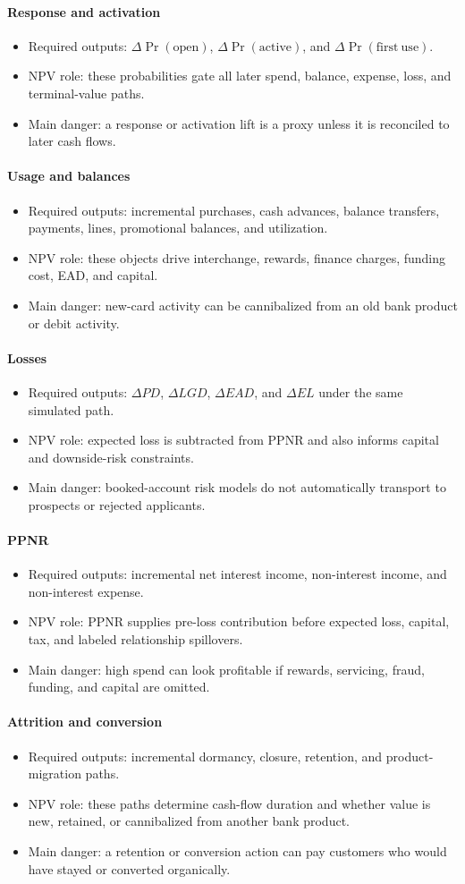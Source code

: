 \documentclass[11pt]{article}
\newcommand{\1}{\mathbf{1}}
\newcommand{\contractitem}[2]{\paragraph{#1}\begin{itemize}[leftmargin=1.5em,itemsep=0.12em,topsep=0.18em]#2\end{itemize}}
\begin{document}
\contractitem{Response and activation}{
  \item Required outputs: $\Delta\Pr(\mathrm{open})$,
        $\Delta\Pr(\mathrm{active})$, and
        $\Delta\Pr(\mathrm{first\ use})$.
  \item NPV role: these probabilities gate all later spend, balance, expense,
        loss, and terminal-value paths.
  \item Main danger: a response or activation lift is a proxy unless it is
        reconciled to later cash flows.
}
\contractitem{Usage and balances}{
  \item Required outputs: incremental purchases, cash advances, balance
        transfers, payments, lines, promotional balances, and utilization.
  \item NPV role: these objects drive interchange, rewards, finance charges,
        funding cost, EAD, and capital.
  \item Main danger: new-card activity can be cannibalized from an old bank
        product or debit activity.
}
\contractitem{Losses}{
  \item Required outputs: $\Delta PD$, $\Delta LGD$, $\Delta EAD$, and
        $\Delta EL$ under the same simulated path.
  \item NPV role: expected loss is subtracted from PPNR and also informs
        capital and downside-risk constraints.
  \item Main danger: booked-account risk models do not automatically transport
        to prospects or rejected applicants.
}
\contractitem{PPNR}{
  \item Required outputs: incremental net interest income, non-interest income,
        and non-interest expense.
  \item NPV role: PPNR supplies pre-loss contribution before expected loss,
        capital, tax, and labeled relationship spillovers.
  \item Main danger: high spend can look profitable if rewards, servicing,
        fraud, funding, and capital are omitted.
}
\contractitem{Attrition and conversion}{
  \item Required outputs: incremental dormancy, closure, retention, and
        product-migration paths.
  \item NPV role: these paths determine cash-flow duration and whether value is
        new, retained, or cannibalized from another bank product.
  \item Main danger: a retention or conversion action can pay customers who
        would have stayed or converted organically.
}
\end{document}
